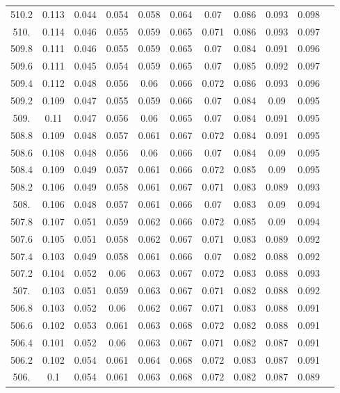 \documentclass[12pt]{ctexart}
\numberwithin{equation}{section}
\begin{document}
\begin{longtable}{ccccccccccc}
510.2	&	0.113	&	0.044	&	0.054	&	0.058	&	0.064	&	0.07	&	0.086	&	0.093	&	0.098	\\
510.	&	0.114	&	0.046	&	0.055	&	0.059	&	0.065	&	0.071	&	0.086	&	0.093	&	0.097	\\
509.8	&	0.111	&	0.046	&	0.055	&	0.059	&	0.065	&	0.07	&	0.084	&	0.091	&	0.096	\\
509.6	&	0.111	&	0.045	&	0.054	&	0.059	&	0.065	&	0.07	&	0.085	&	0.092	&	0.097	\\
509.4	&	0.112	&	0.048	&	0.056	&	0.06	&	0.066	&	0.072	&	0.086	&	0.093	&	0.096	\\
509.2	&	0.109	&	0.047	&	0.055	&	0.059	&	0.066	&	0.07	&	0.084	&	0.09	&	0.095	\\
509.	&	0.11	&	0.047	&	0.056	&	0.06	&	0.065	&	0.07	&	0.084	&	0.091	&	0.095	\\
508.8	&	0.109	&	0.048	&	0.057	&	0.061	&	0.067	&	0.072	&	0.084	&	0.091	&	0.095	\\
508.6	&	0.108	&	0.048	&	0.056	&	0.06	&	0.066	&	0.07	&	0.084	&	0.09	&	0.095	\\
508.4	&	0.109	&	0.049	&	0.057	&	0.061	&	0.066	&	0.072	&	0.085	&	0.09	&	0.095	\\
508.2	&	0.106	&	0.049	&	0.058	&	0.061	&	0.067	&	0.071	&	0.083	&	0.089	&	0.093	\\
508.	&	0.106	&	0.048	&	0.057	&	0.061	&	0.066	&	0.07	&	0.083	&	0.09	&	0.094	\\
507.8	&	0.107	&	0.051	&	0.059	&	0.062	&	0.066	&	0.072	&	0.085	&	0.09	&	0.094	\\
507.6	&	0.105	&	0.051	&	0.058	&	0.062	&	0.067	&	0.071	&	0.083	&	0.089	&	0.092	\\
507.4	&	0.103	&	0.049	&	0.058	&	0.061	&	0.066	&	0.07	&	0.082	&	0.088	&	0.092	\\
507.2	&	0.104	&	0.052	&	0.06	&	0.063	&	0.067	&	0.072	&	0.083	&	0.088	&	0.093	\\
507.	&	0.103	&	0.051	&	0.059	&	0.063	&	0.067	&	0.071	&	0.082	&	0.088	&	0.092	\\
506.8	&	0.103	&	0.052	&	0.06	&	0.062	&	0.067	&	0.071	&	0.083	&	0.088	&	0.091	\\
506.6	&	0.102	&	0.053	&	0.061	&	0.063	&	0.068	&	0.072	&	0.082	&	0.088	&	0.091	\\
506.4	&	0.101	&	0.052	&	0.06	&	0.063	&	0.067	&	0.071	&	0.082	&	0.087	&	0.091	\\
506.2	&	0.102	&	0.054	&	0.061	&	0.064	&	0.068	&	0.072	&	0.083	&	0.087	&	0.091	\\
506.	&	0.1	&	0.054	&	0.061	&	0.063	&	0.068	&	0.072	&	0.082	&	0.087	&	0.089	\\

\end{longtable}
\end{document}
